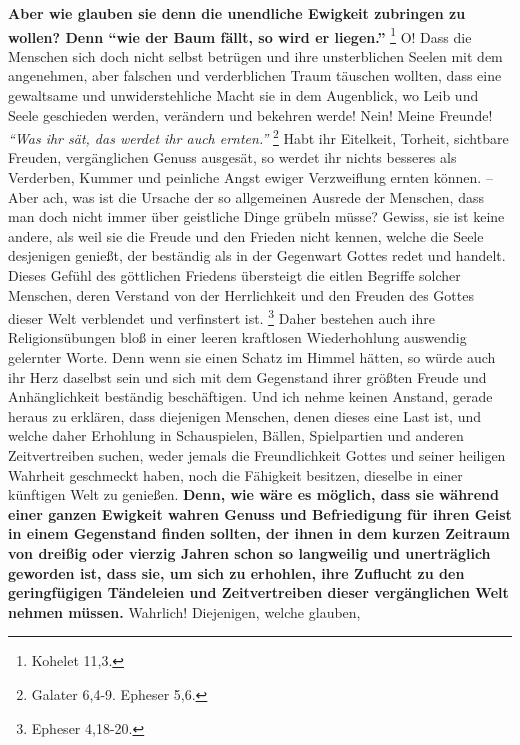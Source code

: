 \label{ref:15_06_langeweile}
\textbf{Aber wie glauben sie denn die unendliche Ewigkeit zubringen zu wollen? Denn
"`wie der Baum fällt, so wird er liegen."'}
\footnote{Kohelet 11,3. }
O! Dass die Menschen sich doch nicht selbst
betrügen und ihre unsterblichen Seelen mit dem angenehmen, aber falschen und
verderblichen Traum täuschen wollten, dass eine gewaltsame und unwiderstehliche
Macht sie in dem Augenblick, wo Leib und Seele geschieden werden, verändern und
bekehren werde! Nein! Meine Freunde!
\textit{"`Was ihr sät, das werdet ihr auch ernten."'}
\footnote{Galater 6,4-9. Epheser 5,6.}
Habt ihr Eitelkeit, Torheit,
sichtbare Freuden, vergänglichen Genuss ausgesät, so werdet ihr nichts besseres
als Verderben, Kummer und peinliche Angst ewiger Verzweiflung ernten können. --
Aber ach, was ist die Ursache der so allgemeinen Ausrede der Menschen, dass man
doch nicht immer über geistliche Dinge grübeln müsse? Gewiss, sie ist keine
andere, als weil sie die Freude und den Frieden nicht kennen, welche die Seele
desjenigen genießt, der beständig als in der Gegenwart Gottes redet und handelt.
Dieses Gefühl des göttlichen Friedens übersteigt die eitlen Begriffe solcher
Menschen, deren Verstand von der Herrlichkeit und den Freuden des Gottes dieser
Welt verblendet und verfinstert ist.
\footnote{Epheser 4,18-20.}
Daher bestehen
auch ihre Religionsübungen bloß in einer leeren kraftlosen Wiederhohlung
auswendig gelernter Worte. Denn wenn sie einen Schatz im Himmel hätten, so würde
auch ihr Herz daselbst sein und sich mit dem Gegenstand ihrer größten Freude
und Anhänglichkeit beständig beschäftigen. Und ich nehme keinen Anstand, gerade
heraus zu erklären, dass diejenigen Menschen, denen dieses eine Last ist, und
welche daher Erhohlung in Schauspielen, Bällen, Spielpartien und anderen
Zeitvertreiben suchen, weder jemals die Freundlichkeit Gottes und seiner
heiligen Wahrheit geschmeckt haben, noch die Fähigkeit besitzen, dieselbe in
einer künftigen Welt zu genießen. \textbf{Denn, wie wäre es möglich, dass sie während
einer ganzen Ewigkeit wahren Genuss und Befriedigung für ihren Geist in einem
Gegenstand finden sollten, der ihnen in dem kurzen Zeitraum von dreißig oder
vierzig Jahren schon so langweilig und unerträglich geworden ist, dass sie, um
sich zu erhohlen, ihre Zuflucht zu den geringfügigen Tändeleien und
Zeitvertreiben dieser vergänglichen Welt nehmen müssen.} Wahrlich! Diejenigen,
welche glauben,
